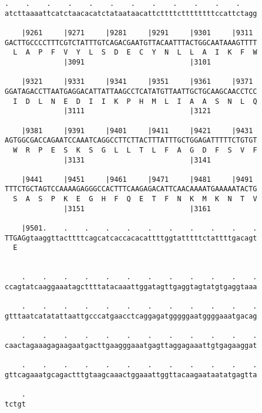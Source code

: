 \documentclass{article}
\begin{document}
\begin{Verbatim}
.    .    .    .    .    .    .    .    .    .    .    .    
atcttaaaattcatctaacacatctataataacattcttttcttttttttccattctagg
                                                            
    |9261     |9271     |9281     |9291     |9301     |9311 
GACTTGCCCCTTTCGTCTATTTGTCAGACGAATGTTACAATTTACTGGCAATAAAGTTTT
  L  A  P  F  V  Y  L  S  D  E  C  Y  N  L  L  A  I  K  F  W
              |3091                         |3101           
  
    |9321     |9331     |9341     |9351     |9361     |9371 
GGATAGACCTTAATGAGGACATTATTAAGCCTCATATGTTAATTGCTGCAAGCAACCTCC
  I  D  L  N  E  D  I  I  K  P  H  M  L  I  A  A  S  N  L  Q
              |3111                         |3121           
  
    |9381     |9391     |9401     |9411     |9421     |9431 
AGTGGCGACCAGAATCCAAATCAGGCCTTCTTACTTTATTTGCTGGAGATTTTTCTGTGT
  W  R  P  E  S  K  S  G  L  L  T  L  F  A  G  D  F  S  V  F
              |3131                         |3141           
  
    |9441     |9451     |9461     |9471     |9481     |9491 
TTTCTGCTAGTCCAAAAGAGGGCCACTTTCAAGAGACATTCAACAAAATGAAAAATACTG
  S  A  S  P  K  E  G  H  F  Q  E  T  F  N  K  M  K  N  T  V
              |3151                         |3161           
  
    |9501.    .    .    .    .    .    .    .    .    .    .
TTGAGgtaaggttacttttcagcatcaccacacattttggtatttttctattttgacagt
  E                                                         
                                                            
  
    .    .    .    .    .    .    .    .    .    .    .    .
ccagtatcaaggaaatagcttttatacaaattggatagttgaggtagtatgtgaggtaaa
                                                            
    .    .    .    .    .    .    .    .    .    .    .    .
gtttaatcatatattaattgcccatgaacctcaggagatgggggaatggggaaatgacag
                                                            
    .    .    .    .    .    .    .    .    .    .    .    .
caactagaaagagaagaatgacttgaagggaaatgagttaggagaaattgtgagaaggat
                                                            
    .    .    .    .    .    .    .    .    .    .    .    .
gttcagaaatgcagactttgtaagcaaactggaaattggttacaagaataatatgagtta
                                                            
    .
tctgt
     

\end{Verbatim}
\end{document}
